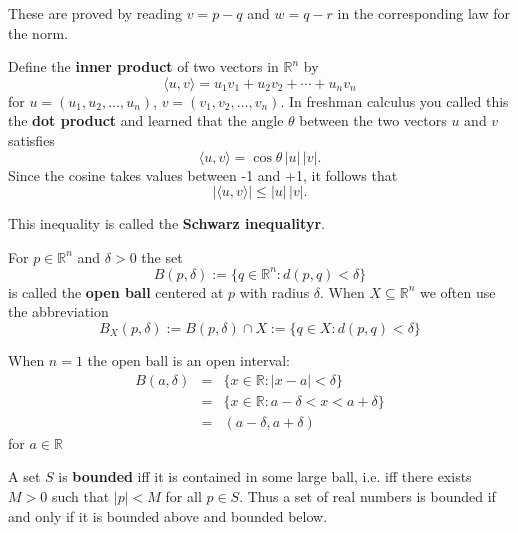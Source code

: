 \documentclass[10pt,a4paper,UTF8]{article}
\begin{document}
These are proved by reading \(v=p-q\) and \(w=q-r\) in the corresponding
law for the norm.


  Define the \textbf{inner product}  of two vectors in \(\mathbb{R}^n\)
by
$$
    \langle u,v \rangle =u_1v_1+u_2v_2+\cdots+u_nv_n
$$
for \(u=(u_1,u_2,\ldots,u_n)\), \(v=(v_1,v_2,\ldots,v_n)\). In freshman calculus you called this the \textbf{dot product}
and learned that the angle \(\theta\) between the two vectors \(u\) and \(v\) satisfies
$$
    \langle u,v \rangle =\cos\theta\,|u|\,|v|.
$$
Since the cosine takes values between -1 and +1, it follows that
\begin{equation}
\label{eq:1}
    |\langle u,v \rangle | \le |u|\,|v|.
\end{equation}

This inequality is called the \textbf{Schwarz inequalityr}.



For \(p\in\mathbb{R}^n\) and \(\delta>0\) the set
$$
    B(p,\delta):=\{q\in\mathbb{R}^n:d(p,q)<\delta\}
$$
is called the \textbf{open ball}  centered at \(p\) with radius \(\delta\).
When \(X\subseteq\mathbb{R}^n\) we often use the abbreviation
$$
    B_X(p,\delta):=B(p,\delta)\cap X:=\{q\in X: d(p,q)<\delta\}
$$

When \(n=1\) the open ball is an open interval:
\begin{eqnarray*}
 B(a,\delta)&=&\{x\in\mathbb{R}: |x-a| < \delta\}\\
            &=&\{x\in\mathbb{R}: a-\delta < x < a+\delta\}\\
            &=&(a-\delta,a+\delta)
\end{eqnarray*}
for \(a\in\mathbb{R}\)


 A set \(S\) is \textbf{bounded}  iff it is contained
in some large ball, i.e. iff there exists \(M>0\) such that
\(|p| < M\) for all \(p\in S\). Thus a set of real numbers
is bounded if and only if it is bounded above and bounded below.
\end{document}
